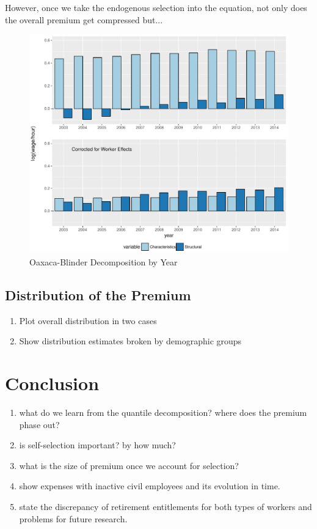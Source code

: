 \documentclass{article}
\begin{document}
\noindent
However, once we take the endogenous selection into the equation, not only does the overall premium get compressed but...


\begin{figure}[h!]
    \includegraphics[scale=0.65]{graphs/002_yearly_ob_onepc.pdf}
    \caption{Oaxaca-Blinder Decomposition by Year}
    \label{fig:yearly}
\end{figure}
\subsection{Distribution of the Premium}
\begin{enumerate}
    \item Plot overall distribution in two cases
    \item Show distribution estimates broken by demographic groups
\end{enumerate}

\section{Conclusion}
 \begin{enumerate}
     \item what do we learn from the quantile decomposition? where does the premium phase out?
     \item is self-selection important? by how much?
     \item what is the size of premium once we account for selection?
     \item show expenses with inactive civil employees and its evolution in time.
     \item state the discrepancy of retirement entitlements for both types of workers and problems for future research. 
\end{enumerate}  

\newpage
\scriptsize{}
\end{document}
